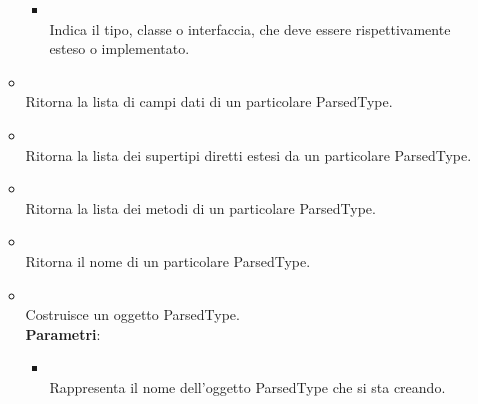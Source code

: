 \begin{itemize}
\begin{itemize}
\begin{itemize}
\item {}
\\ Indica il tipo, classe o interfaccia, che deve essere rispettivamente esteso o implementato.
\end{itemize}
\item {}
\\ Ritorna la lista di campi dati di un particolare ParsedType.
\item {}
\\ Ritorna la lista dei supertipi diretti estesi da un particolare ParsedType.
\item {}
\\ Ritorna la lista dei metodi di un particolare ParsedType.
\item {}
\\ Ritorna il nome di un particolare ParsedType.
\item {}
\\ Costruisce un oggetto ParsedType.
\\ \textbf{Parametri}:
\begin{itemize}
\item {}
\\ Rappresenta il nome dell'oggetto ParsedType che si sta creando.
\end{itemize}
\end{itemize}
\end{itemize}

